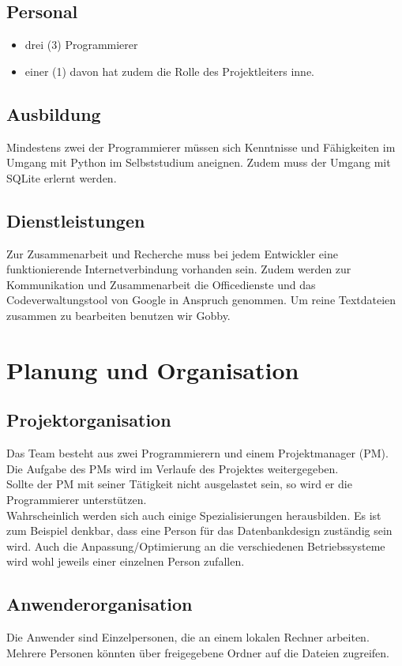\documentclass[10pt,paper=a4,final]{scrartcl}
\begin{document}
\subsection{Personal}
\begin{itemize}
\item drei (3) Programmierer
\item einer (1) davon hat zudem die Rolle des Projektleiters inne.
\end{itemize}
\subsection{Ausbildung}
Mindestens zwei der Programmierer müssen sich Kenntnisse und Fähigkeiten im Umgang mit Python im Selbststudium aneignen.
Zudem muss der Umgang mit SQLite erlernt werden.
\subsection{Dienstleistungen}
Zur Zusammenarbeit und Recherche muss bei jedem Entwickler eine funktionierende Internetverbindung vorhanden sein.
Zudem werden zur Kommunikation und Zusammenarbeit die Officedienste und das Codeverwaltungstool von Google in Anspruch genommen. Um reine Textdateien zusammen zu bearbeiten benutzen wir Gobby.

\section{Planung und Organisation}
\subsection{Projektorganisation}
Das Team besteht aus zwei Programmierern und einem Projektmanager (PM).\\
Die Aufgabe des PMs wird im Verlaufe des Projektes weitergegeben.\\
Sollte der PM mit seiner Tätigkeit nicht ausgelastet sein, so wird er die Programmierer unterstützen.\\
Wahrscheinlich werden sich auch einige Spezialisierungen herausbilden. Es ist zum Beispiel denkbar, dass eine Person für das Datenbankdesign zuständig sein wird. Auch die Anpassung/Optimierung an die verschiedenen Betriebssysteme wird wohl jeweils einer einzelnen Person zufallen.
\subsection{Anwenderorganisation}
Die Anwender sind Einzelpersonen, die an einem lokalen Rechner arbeiten. Mehrere Personen könnten über freigegebene Ordner auf die Dateien zugreifen.
\end{document}
